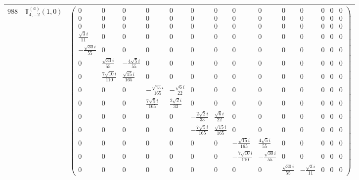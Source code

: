 \documentclass[fleqn,8pt,landscape]{jsarticle}
\begin{document}
\begin{center}
\begin{longtable}{ccc}
$ 988 $ & $ \mathbb{T}_{4,-2}^{(a)}(1,0) $ & $ \begin{pmatrix} 0 & 0 & 0 & 0 & 0 & 0 & 0 & 0 & 0 & 0 & 0 & 0 & 0 & 0 \\ 0 & 0 & 0 & 0 & 0 & 0 & 0 & 0 & 0 & 0 & 0 & 0 & 0 & 0 \\ 0 & 0 & 0 & 0 & 0 & 0 & 0 & 0 & 0 & 0 & 0 & 0 & 0 & 0 \\ \frac{\sqrt{3} i}{11} & 0 & 0 & 0 & 0 & 0 & 0 & 0 & 0 & 0 & 0 & 0 & 0 & 0 \\ - \frac{\sqrt{30} i}{55} & 0 & 0 & 0 & 0 & 0 & 0 & 0 & 0 & 0 & 0 & 0 & 0 & 0 \\ 0 & \frac{\sqrt{30} i}{55} & - \frac{4 \sqrt{5} i}{55} & 0 & 0 & 0 & 0 & 0 & 0 & 0 & 0 & 0 & 0 & 0 \\ 0 & \frac{7 \sqrt{10} i}{110} & \frac{\sqrt{15} i}{165} & 0 & 0 & 0 & 0 & 0 & 0 & 0 & 0 & 0 & 0 & 0 \\ 0 & 0 & 0 & - \frac{\sqrt{15} i}{165} & - \frac{\sqrt{6} i}{22} & 0 & 0 & 0 & 0 & 0 & 0 & 0 & 0 & 0 \\ 0 & 0 & 0 & \frac{7 \sqrt{5} i}{165} & \frac{2 \sqrt{2} i}{33} & 0 & 0 & 0 & 0 & 0 & 0 & 0 & 0 & 0 \\ 0 & 0 & 0 & 0 & 0 & - \frac{2 \sqrt{2} i}{33} & \frac{\sqrt{6} i}{22} & 0 & 0 & 0 & 0 & 0 & 0 & 0 \\ 0 & 0 & 0 & 0 & 0 & - \frac{7 \sqrt{5} i}{165} & \frac{\sqrt{15} i}{165} & 0 & 0 & 0 & 0 & 0 & 0 & 0 \\ 0 & 0 & 0 & 0 & 0 & 0 & 0 & - \frac{\sqrt{15} i}{165} & \frac{4 \sqrt{5} i}{55} & 0 & 0 & 0 & 0 & 0 \\ 0 & 0 & 0 & 0 & 0 & 0 & 0 & - \frac{7 \sqrt{10} i}{110} & - \frac{\sqrt{30} i}{55} & 0 & 0 & 0 & 0 & 0 \\ 0 & 0 & 0 & 0 & 0 & 0 & 0 & 0 & 0 & \frac{\sqrt{30} i}{55} & - \frac{\sqrt{3} i}{11} & 0 & 0 & 0 \end{pmatrix} $ \\ \hline

\end{longtable}
\end{center}
\end{document}
